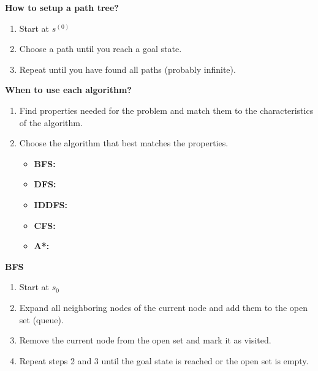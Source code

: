 \begin{process} \textbf{How to setup a path tree?}
    \begin{enumerate}
        \item Start at $s^{(0)}$
        \item Choose a path until you reach a goal state.
        \item Repeat until you have found all paths (probably infinite).
    \end{enumerate}
\end{process}

\begin{example}
\end{example}

\newpage

\begin{process} \textbf{When to use each algorithm?}
    \begin{enumerate}
        \item Find properties needed for the problem and match them to the characteristics of the algorithm.
        \item Choose the algorithm that best matches the properties.
        \begin{itemize}
            \item \textbf{BFS:} 
            \item \textbf{DFS:} 
            \item \textbf{IDDFS:} 
            \item \textbf{CFS:}
            \item \textbf{A*:} 
        \end{itemize}
    \end{enumerate}
\end{process}

\begin{example}
    
\end{example}
\newpage

\begin{example}
\end{example}

\begin{process} \textbf{BFS}
    \begin{enumerate}
        \item Start at $s_0$ 
        \item Expand all neighboring nodes of the current node and add them to the open set (queue).
        \item Remove the current node from the open set and mark it as visited.
        \item Repeat steps 2 and 3 until the goal state is reached or the open set is empty.
    \end{enumerate}
\end{process}

